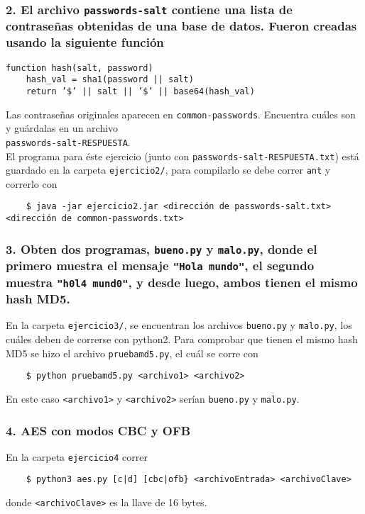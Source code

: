 \documentclass[14pt]{article}
\begin{document}
\subsubsection*{2. El archivo \texttt{passwords-salt} contiene una lista de contraseñas obtenidas de una base de datos. Fueron creadas usando la siguiente función}
\begin{verbatim}
function hash(salt, password)
    hash_val = sha1(password || salt)
    return ’$’ || salt || ’$’ || base64(hash_val)
\end{verbatim}
Las contraseñas originales aparecen en \texttt{common-passwords}. Encuentra cuáles son y guárdalas en un archivo\\ \texttt{passwords-salt-RESPUESTA}. \\

El programa para éste ejercicio (junto con \texttt{passwords-salt-RESPUESTA.txt}) está guardado en la carpeta \texttt{ejercicio2/}, para compilarlo se debe correr \texttt{ant} y correrlo con
\begin{verbatim}
    $ java -jar ejercicio2.jar <dirección de passwords-salt.txt> <dirección de common-passwords.txt>
\end{verbatim}

\subsubsection*{3. Obten dos programas, \texttt{bueno.py} y \texttt{malo.py}, donde el primero muestra el mensaje \texttt{"Hola mundo"}, el segundo muestra \texttt{"h0l4 mund0"}, y desde luego, ambos tienen el mismo hash MD5.}
En la carpeta \texttt{ejercicio3/}, se encuentran los archivos \texttt{bueno.py} y \texttt{malo.py}, los cuáles deben de correrse con \textsf{python2}. Para comprobar que tienen el mismo hash MD5 se hizo el archivo \texttt{pruebamd5.py}, el cuál se corre con 
\begin{verbatim}
    $ python pruebamd5.py <archivo1> <archivo2>
\end{verbatim}
En este caso \texttt{<archivo1>} y \texttt{<archivo2>} serían \texttt{bueno.py} y \texttt{malo.py}.

\subsubsection*{4. AES con modos CBC y OFB}
En la carpeta \texttt{ejercicio4} correr
\begin{verbatim}
    $ python3 aes.py [c|d] [cbc|ofb} <archivoEntrada> <archivoClave>
\end{verbatim}
donde \texttt{<archivoClave>} es la llave de 16 bytes.
\end{document}
